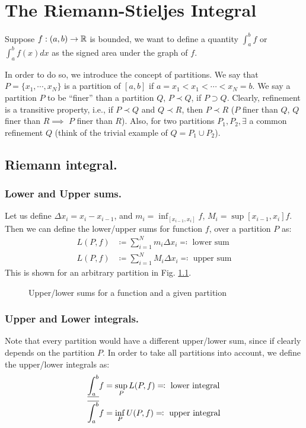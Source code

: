 \chapter{The Riemann-Stieljes Integral}

Suppose $f:(a,b)\to\mathbb{R}$ is bounded, we want to define a quantity $\int_a^b f$ or $\int_a^b f(x) dx$ as the signed area under the graph of $f$.

In order to do so, we introduce the concept of partitions.
We say that $P=\{x_1,\cdots,x_N\}$ is a partition of $[a,b]$ if $a=x_1<x_1<\cdots<x_N=b$.
We say a partition $P$ to be ``finer'' than a partition $Q$, $P\prec Q$, if $P\supset Q$.
Clearly, refinement is a transitive property, i.e., if $P\prec Q$ and $Q\prec R$, then $P\prec R$ ($P$ finer than $Q$, $Q$ finer than $R\implies$ $P$ finer than $R$).
Also, for two partitions $P_1,P_2,\exists$ a common refinement $Q$ (think of the trivial example of $Q=P_1\cup P_2$).

\section{Riemann integral.}

\subsection{Lower and Upper sums.}
Let us define $\Delta x_i=x_{i}-x_{i-1}$, and $m_i=\inf_{[x_{i-1},x_i]} f$, $M_i=\sup{[x_{i-1},x_i]} f$.
Then we can define the lower/upper sums for function $f$, over a partition $P$ as:
\begin{equation}
\begin{split}
L(P,f) &\coloneqq \sum^N_{i=1} m_i\Delta x_i \eqqcolon \text{ lower sum}\\
L(P,f) &\coloneqq \sum^N_{i=1} M_i\Delta x_i \eqqcolon \text{ upper sum}
\end{split}
\end{equation}
This is shown for an arbitrary partition in Fig. \ref{fig:uplowSum}.
\begin{figure}[!ht]
    \centering
    \scalebox{0.80}{}
    \caption{Upper/lower sums for a function and a given partition}
    \label{fig:uplowSum}
\end{figure}

\subsection{Upper and Lower integrals.}
Note that every partition would have a different upper/lower sum, since if clearly depends on the partition $P$.
In order to take all partitions into account, we define the upper/lower integrals as:
\begin{equation}
\begin{split}
\underline{\int_{a}^{b}}f &= \sup_{P}L(P,f)\eqqcolon \text{ lower integral}\\
\overline{\int_{a}^{b}}f &= \inf_{P}U(P,f)\eqqcolon \text{ upper integral}
\end{split}
\end{equation}

